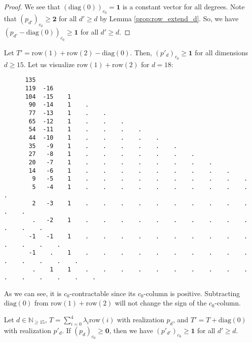 \begin{proof}
     We see that \( (\mathrm{diag}(0))_{c_0} = \mathbf 1 \) is a constant vector for all degrees. Note that \( (p_{d'})_{c_0} \geq \mathbf 2 \) for all \( d' \geq d \) by Lemma \ref{prop:row_extend_d}. So, we have \( (p_{d'} - \mathrm{diag}(0))_{c_0} \geq \mathbf 1 \) for all \( d' \geq d \).
\end{proof}


\begin{example}
    Let \( T' = \mathrm{row}(1) + \mathrm{row}(2) - \mathrm{diag}(0)\).
    Then, \((p'_d)_{c_0} \geq \mathbf 1 \) for all dimensions \( d \geq 15 \). Let us visualize \( \mathrm{row}(1) + \mathrm{row}(2) \) for \( d = 18 \):
    \begingroup
    \fontsize{8pt}{10pt}\selectfont
    \begin{verbatim}
      135 
      119  -16 
      104  -15    1 
       90  -14    1    . 
       77  -13    1    .    . 
       65  -12    1    .    .    . 
       54  -11    1    .    .    .    . 
       44  -10    1    .    .    .    .    . 
       35   -9    1    .    .    .    .    .    . 
       27   -8    1    .    .    .    .    .    .    . 
       20   -7    1    .    .    .    .    .    .    .    . 
       14   -6    1    .    .    .    .    .    .    .    .    . 
        9   -5    1    .    .    .    .    .    .    .    .    .    . 
        5   -4    1    .    .    .    .    .    .    .    .    .    .    . 
        2   -3    1    .    .    .    .    .    .    .    .    .    .    .    . 
        .   -2    1    .    .    .    .    .    .    .    .    .    .    .    .    . 
       -1   -1    1    .    .    .    .    .    .    .    .    .    .    .    .    .    . 
       -1    .    1    .    .    .    .    .    .    .    .    .    .    .    .    .    .    . 
        .    1    1    .    .    .    .    .    .    .    .    .    .    .    .    .    .    .    .
    \end{verbatim}
    \endgroup
    As we can see, it is \( c_0 \)-contractable since its \( c_0 \)-column is positive. Subtracting \( \mathrm{diag}(0) \) from \( \mathrm{row}(1) + \mathrm{row}(2) \) will not change the sign of the \( c_0 \)-column.
  \end{example}

\begin{proposition}\label{prop:row_homo_zero_diag}
     Let \( d \in \mathbb{N}_{\geq 15} \), \( T = \sum_{i=0}^4 \lambda_i \mathrm{row}(i)\) with realization \( p_d \), and \( T' = T + \mathrm{diag}(0) \) with realization \( p'_d \). If \( (p_d)_{c_0} \geq \mathbf{0} \), then we have \( (p'_{d'})_{c_0} \geq \mathbf 1 \) for all \( d' \geq d \).
\end{proposition}
  
